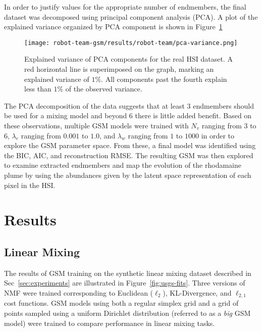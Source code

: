In order to justify values for the appropriate number of endmembers, the final
dataset was decomposed using principal component analysis (PCA). A plot of the
explained variance organized by PCA component is shown in
Figure~\ref{fig:robot-team-pca}

\begin{figure}[!h]
  \centering
  \texttt{[image: robot-team-gsm/results/robot-team/pca-variance.png]}
  \caption{Explained variance of PCA components for the real HSI dataset. A red
    horizontal line is superimposed on the graph, marking an explained variance
    of $1\%$. All components past the fourth explain less than $1\%$ of the
    observed variance.}
  \label{fig:robot-team-pca}
\end{figure}

The PCA decomposition of the data suggests that at least $3$ endmembers should
be used for a mixing model and beyond $6$ there is little added benefit. Based
on these observations, multiple GSM models were trained with $N_v$ ranging from
$3$ to $6$, $\lambda_e$ ranging from $0.001$ to $1.0$, and $\lambda_w$ ranging
from $1$ to $1000$ in order to explore the GSM parameter space. From these, a
final model was identified using the BIC, AIC, and reconstruction RMSE. The
resulting GSM was then explored to examine extracted endmembers and map the
evolution of the rhodamaine plume by using the abundances given by the latent
space representation of each pixel in the HSI.



\section{Results}


\subsection{Linear Mixing}

The results of GSM training on the synthetic linear mixing dataset described in
Sec~\ref{sec:experiments} are illustrated in Figure~\ref{fig:usgs-fits}. Three
versions of NMF were trained corresponding to Euclidean ($\ell_2$),
KL-Divergence, and $\ell_{2,1}$ cost functions. GSM models using both a regular
simplex grid and a grid of points sampled using a uniform Dirichlet distribution
(referred to as a \textit{big} GSM model) were trained to compare performance in
linear mixing tasks.

\newpage

